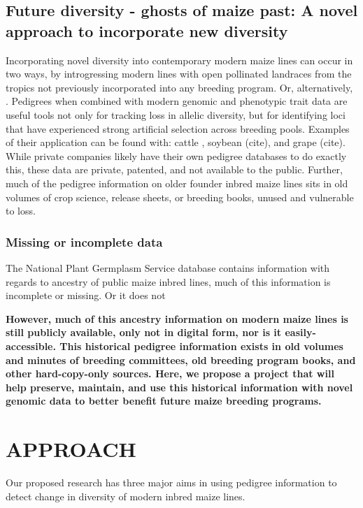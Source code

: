 \documentclass[12pt]{article}
\begin{document}
\subsection*{Future diversity - ghosts of maize past: A novel approach to incorporate new diversity}

Incorporating novel diversity into contemporary modern maize lines can occur in two ways, by introgressing modern lines with open pollinated landraces from the tropics not previously incorporated into any breeding program. Or, alternatively, 
%
%
. Pedigrees when combined with modern genomic and phenotypic trait data are useful tools not only for tracking loss in allelic diversity, but for identifying loci that have experienced strong artificial selection across breeding pools. Examples of their application can be found with: cattle \citep{Decker:2012kd}, soybean (cite), and grape (cite). 
While private companies likely have their own pedigree databases to do exactly this, these data are private, patented, and not available to the public. 
Further, much of the pedigree information on older founder inbred maize lines sits in old volumes of crop science, release sheets, or breeding books, unused and vulnerable to loss.
%
%
\subsubsection*{Missing or incomplete data}
\par The National Plant Germplasm Service database contains information with regards to ancestry of public maize inbred lines, much of this information is incomplete or missing. Or it does not 

\textbf{However, much of this ancestry information on modern maize lines  is still publicly available, only not in digital form, nor is it easily-accessible. This historical pedigree information exists in old volumes and minutes of breeding committees, old breeding program books, and other hard-copy-only sources. Here, we propose a project that will help preserve, maintain, and use this historical information with novel genomic data to better benefit future maize breeding programs.} 

\section*{APPROACH}
\label{S:3}
Our proposed research has three major aims in using pedigree information to detect change in diversity of modern inbred maize lines.
\end{document}
